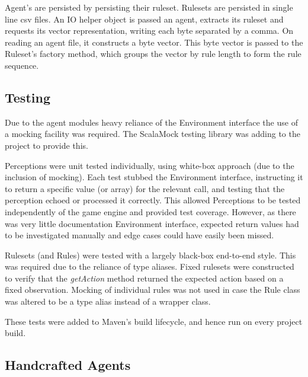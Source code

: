Agent's are persisted by persisting their ruleset. Rulesets are persisted in single line csv files. An IO helper object is passed an agent, extracts its ruleset and requests its vector representation, writing each byte separated by a comma. On reading an agent file, it constructs a byte vector. This byte vector is passed to the Ruleset's factory method, which groups the vector by rule length to form the rule sequence.


\subsection{Testing}
\label{subsec:agenttest}

Due to the agent modules heavy reliance of the Environment interface the use of a mocking facility was required. The ScalaMock testing library was adding to the project to provide this.

Perceptions were unit tested individually, using white-box approach (due to the inclusion of mocking). Each test stubbed the Environment interface, instructing it to return a specific value (or array) for the relevant call, and testing that the perception echoed or processed it correctly. This allowed Perceptions to be tested independently of the game engine and provided test coverage. However, as there was very little documentation Environment interface, expected return values had to be investigated manually and edge cases could have easily been missed.

Rulesets (and Rules) were tested with a largely black-box end-to-end style. This was required due to the reliance of type aliases. Fixed rulesets were constructed to verify that the \emph{getAction} method returned the expected action based on a fixed observation. Mocking of individual rules was not used in case the Rule class was altered to be a type alias instead of a wrapper class.

These tests were added to Maven's build lifecycle, and hence run on every project build.


\subsection{Handcrafted Agents}
\label{subsec:hca}


